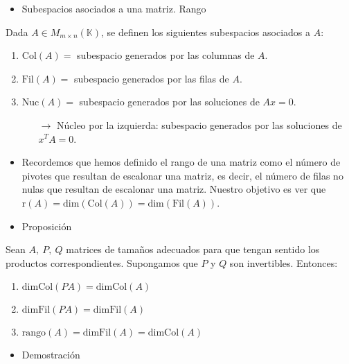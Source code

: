 \documentclass[12pt]{article}
\begin{document}
\begin{itemize}[label=\color{red}\textbullet, leftmargin=*]
    \item \color{lightblue}Subespacios asociados a una matriz. Rango
\end{itemize}
Dada $A\in M_{m\times n}(\mathbb{K})$, se definen los siguientes subespacios asociados a $A$:
\begin{enumerate}[label=\arabic*)]
\item $\mathrm{Col}(A)=$ subespacio generados por las columnas de $A$.
\item $\mathrm{Fil}(A)=$ subespacio generados por las filas de $A$.
\item $\mathrm{Nuc}(A)=$ subespacio generados por las soluciones de $Ax=0$.
\begin{itemize}
\item[$\longrightarrow$] Núcleo por la izquierda: subespacio generados por las soluciones de $x^TA=0$.
\end{itemize}
\end{enumerate}
\begin{itemize}[leftmargin=*]
\item Recordemos que hemos definido el rango de una matriz como el número de pivotes que resultan de escalonar una matriz, es decir, el número de filas no nulas que resultan de escalonar una matriz. Nuestro objetivo es ver que $\mathrm{r}(A)=\mathrm{dim}\left(\mathrm{Col}(A)\right)=\mathrm{dim}(\mathrm{Fil}(A))$.
\end{itemize}
\begin{itemize}[label=\color{red}\textbullet, leftmargin=*]
    \item \color{lightblue}Proposición
\end{itemize}
Sean $A,~P,~Q$ matrices de tamaños adecuados para que tengan sentido los productos correspondientes. Supongamos que $P$ y $Q$ son invertibles. Entonces:
\begin{enumerate}[label=\arabic*)]
    \item $\mathrm{dim Col}(PA)=\mathrm{dim Col}(A)$
    \item $\mathrm{dim Fil}(PA)=\mathrm{dim Fil}(A)$
    \item $\mathrm{rango}(A)=\mathrm{dimFil}(A)=\mathrm{dimCol}(A)$
\end{enumerate}
\begin{itemize}[label=\color{red}\textbullet, leftmargin=*]
    \item \color{lightblue}Demostración
\end{itemize}
\end{document}
